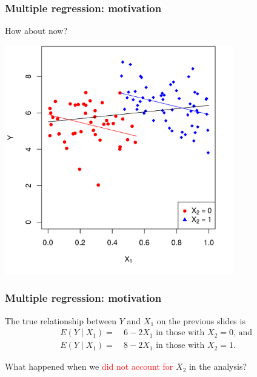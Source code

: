 \documentclass[12pt, 
hyperref={colorlinks=true, linkcolor=blue, urlcolor=cyan}]{beamer}
\begin{document}
\begin{frame}
\frametitle{Multiple regression: motivation}
How about now?

\vspace{-0.3cm}
\centering
\includegraphics[width = 0.75\textwidth]{./plots/confounding_colored_with_lines.png}
\end{frame}

\begin{frame}
\frametitle{Multiple regression: motivation}
The true relationship between $Y$ and $X_1$ on the previous slides is 
\begin{align*}
E(Y \mid X_1) =& \ 6 - 2 X_1 \text{ in those with $X_2 = 0$, and } \\
E(Y \mid X_1) =& \ 8 - 2 X_1 \text{ in those with $X_2 = 1$}.
\end{align*}

What happened when we \textcolor{red}{did not account for} $X_2$ in the analysis? 

\end{frame}
\end{document}
